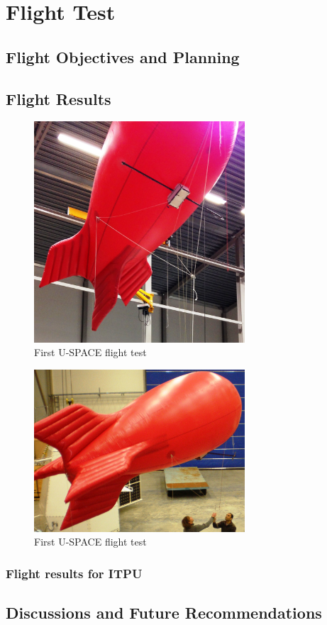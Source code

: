 \newpage
\chapter{Flight Test}
\label{chap:flight_test}

\section{Flight Objectives and Planning}

\section{Flight Results}

\begin{figure}[H]
\centering
\includegraphics[width=0.7\textwidth]{figures/fig_FlightTest1_1}
\caption{First U-SPACE flight test}
\label{fig:FlightTest1_1}
\end{figure}

\begin{figure}[H]
\centering
\includegraphics[width=0.7\textwidth]{figures/fig_FlightTest1_2}
\caption{First U-SPACE flight test}
\label{fig:FlightTest1_2}
\end{figure}


\subsection{Flight results for ITPU}



\section{Discussions and Future Recommendations}

